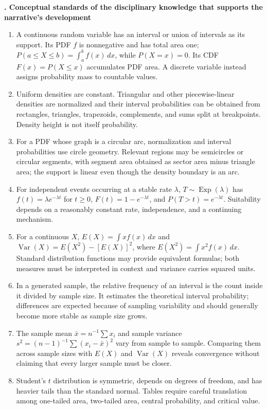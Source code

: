 \documentclass[10pt,letterpaper]{article}
\newcommand{\sectionbar}[1]{%
	\begin{tcolorbox}[
		enhanced,
		colback=sectionblue,
		colframe=sectionblue,
		boxrule=0pt,
		sharp corners,
		left=0.32in,
		right=0.08in,
		top=3.5pt,
		bottom=3.5pt,
		before skip=0pt,
		after skip=0pt,
		borderline north={1.15pt}{0pt}{black},
		borderline south={1.15pt}{0pt}{black}
		]
		\color{white}\bfseries\fontsize{12}{14}\selectfont #1
	\end{tcolorbox}%
}
\newcommand{\plansection}[1]{%
	\Needspace{8\baselineskip}\par\vspace{0.23in}\sectionbar{#1}\vspace{0.20in}%
}
\begin{document}
\plansection{3. Conceptual standards of the disciplinary knowledge that supports the narrative's development}
\begin{bluebox}
\begin{enumerate}[label=\textbf{\arabic*.}]
  \item A continuous random variable has an interval or union of intervals as its support. Its PDF $f$ is nonnegative and has total area one; $P(a\le X\le b)=\int_a^b f(x)\,dx$, while $P(X=x)=0$. Its CDF $F(x)=P(X\le x)$ accumulates PDF area. A discrete variable instead assigns probability mass to countable values.
  \item Uniform densities are constant. Triangular and other piecewise-linear densities are normalized and their interval probabilities can be obtained from rectangles, triangles, trapezoids, complements, and sums split at breakpoints. Density height is not itself probability.
  \item For a PDF whose graph is a circular arc, normalization and interval probabilities use circle geometry. Relevant regions may be semicircles or circular segments, with segment area obtained as sector area minus triangle area; the support is linear even though the density boundary is an arc.
  \item For independent events occurring at a stable rate $\lambda$, $T\sim\operatorname{Exp}(\lambda)$ has $f(t)=\lambda e^{-\lambda t}$ for $t\ge0$, $F(t)=1-e^{-\lambda t}$, and $P(T>t)=e^{-\lambda t}$. Suitability depends on a reasonably constant rate, independence, and a continuing mechanism.
  \item For a continuous $X$, $E(X)=\int xf(x)\,dx$ and $\operatorname{Var}(X)=E(X^2)-[E(X)]^2$, where $E(X^2)=\int x^2f(x)\,dx$. Standard distribution functions may provide equivalent formulas; both measures must be interpreted in context and variance carries squared units.
  \item In a generated sample, the relative frequency of an interval is the count inside it divided by sample size. It estimates the theoretical interval probability; differences are expected because of sampling variability and should generally become more stable as sample size grows.
  \item The sample mean $\bar x=n^{-1}\sum x_i$ and sample variance $s^2=(n-1)^{-1}\sum(x_i-\bar x)^2$ vary from sample to sample. Comparing them across sample sizes with $E(X)$ and $\operatorname{Var}(X)$ reveals convergence without claiming that every larger sample must be closer.
  \item Student's $t$ distribution is symmetric, depends on degrees of freedom, and has heavier tails than the standard normal. Tables require careful translation among one-tailed area, two-tailed area, central probability, and critical value.

\end{enumerate}
\end{bluebox}
\end{document}
